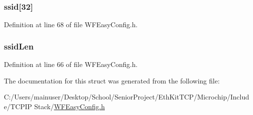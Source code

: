 \subsubsection[{ssid}]{ ssid\mbox{[}32\mbox{]}}\label{structt_w_f_psk_calc_req_ac951c37257280e8e3ce11cea1f115d4a}


Definition at line 68 of file W\+F\+Easy\+Config.\+h.

\hypertarget{structt_w_f_psk_calc_req_a2172fc4e4cae6a48b945435288912995}{}
\subsubsection[{ssid\+Len}]{ ssid\+Len}\label{structt_w_f_psk_calc_req_a2172fc4e4cae6a48b945435288912995}


Definition at line 66 of file W\+F\+Easy\+Config.\+h.



The documentation for this struct was generated from the following file\+:\begin{DoxyCompactItemize}
\item 
C\+:/\+Users/mainuser/\+Desktop/\+School/\+Senior\+Project/\+Eth\+Kit\+T\+C\+P/\+Microchip/\+Include/\+T\+C\+P\+I\+P Stack/\hyperlink{_w_f_easy_config_8h}{W\+F\+Easy\+Config.\+h}\end{DoxyCompactItemize}

